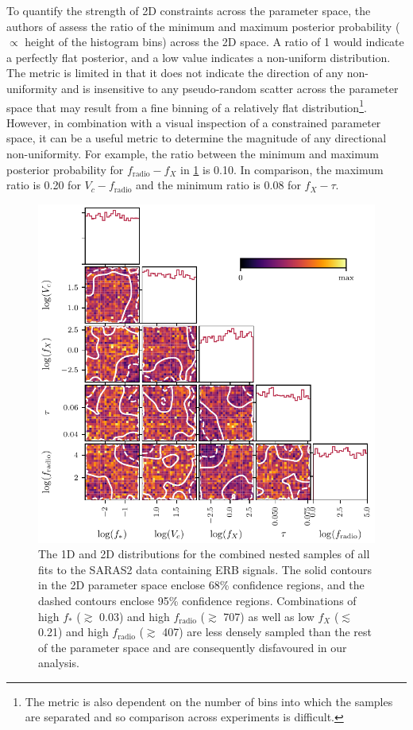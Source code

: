 To quantify the strength of 2D constraints across the parameter space, the authors of \cite{HERA_2022b} assess the ratio of the minimum and maximum posterior probability ($\propto$ height of the histogram bins) across the 2D space. A ratio of 1 would indicate a perfectly flat posterior, and a low value indicates a non-uniform distribution. The metric is limited in that it does not indicate the direction of any non-uniformity and is insensitive to any pseudo-random scatter across the parameter space that may result from a fine binning of a relatively flat distribution\footnote{The metric is also dependent on the number of bins into which the samples are separated and so comparison across experiments is difficult.}. However, in combination with a visual inspection of a constrained parameter space, it can be a useful metric to determine the magnitude of any directional non-uniformity. For example, the ratio between the minimum and maximum posterior probability for $f_\mathrm{radio}-f_X$ in \cref{fig:combined_samples_fradio} is 0.10. In comparison, the maximum ratio is 0.20 for $V_c - f_\mathrm{radio}$ and the minimum ratio is 0.08 for $f_X - \tau$.

\begin{figure}
    \centering
    \includegraphics{saras2/figs/fradio_merged_samples_posterior_hist.pdf}
    \caption{The 1D and 2D distributions for the combined nested samples of all fits to the SARAS2 data containing ERB signals. The solid contours in the 2D parameter space enclose 68\% confidence regions, and the dashed contours enclose 95\% confidence regions. Combinations of high $f_*$ ($\gtrsim$ 0.03) and high $f_\mathrm{radio}$ ($\gtrsim$ 707) as well as low $f_X$ ($\lesssim$0.21) and high $f_\mathrm{radio}$ ($\gtrsim$ 407) are less densely sampled than the rest of the parameter space and are consequently disfavoured in our analysis.}
    \label{fig:combined_samples_fradio}
\end{figure}


